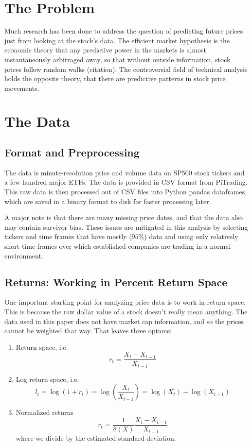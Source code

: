 \documentclass{article}
\begin{document}
\section{The Problem}


Much research has been done to address the question of predicting future prices
just from looking at the stock's data. The efficient market hypothesis is the
economic theory that any predictive power in the markets is almost 
instantaneously arbitraged away, so that without outside information, stock prices 
follow random walks (citation). The controversial field of technical analysis holds the
opposite theory, that there are predictive patterns in stock price movements.

\section{The Data}

\subsection{Format and Preprocessing}
The data is minute-resolution price and volume data on SP500 stock tickers and 
a few hundred major ETFs.
The data is provided in CSV format from PiTrading. This raw data is then processed
out of CSV files into Python pandas dataframes, which are saved in a binary format
to disk for faster processing later. 

A major note is that there are many missing price dates, and that the data also may
contain survivor bias. These issues are mitigated in this analysis by selecting
tickers and time frames that have mostly ($95\%$) data and using only relatively
short time frames over which established companies are trading in a normal environment.

\subsection{Returns: Working in Percent Return Space}

One important starting point for analyzing price data is to work in return space.
This is because the raw dollar value of a stock doesn't really mean anything. The
data used in this paper does not have market cap information, and so the prices
cannot be weighted that way. That leaves three options:

\begin{enumerate}
    \item
        Return space, i.e.
        \[ r_t = \frac{X_t - X_{t-1}}{X_{t-1}} \]
    \item
        Log return space, i.e.
        \[ l_t = \log\left( 1+ r_t \right) = \log\left( \frac{X_t}{X_{t-1}} \right) = \log(X_t) - \log(X_{t-1}) \] 
    \item
        Normalized returns
        \[ r_{t} = \frac{1}{\hat{\sigma}(X)} \frac{X_t - X_{t-1}}{X_{t-1}} \]
        where we divide by the estimated standard deviation.
\end{enumerate}
\end{document}
